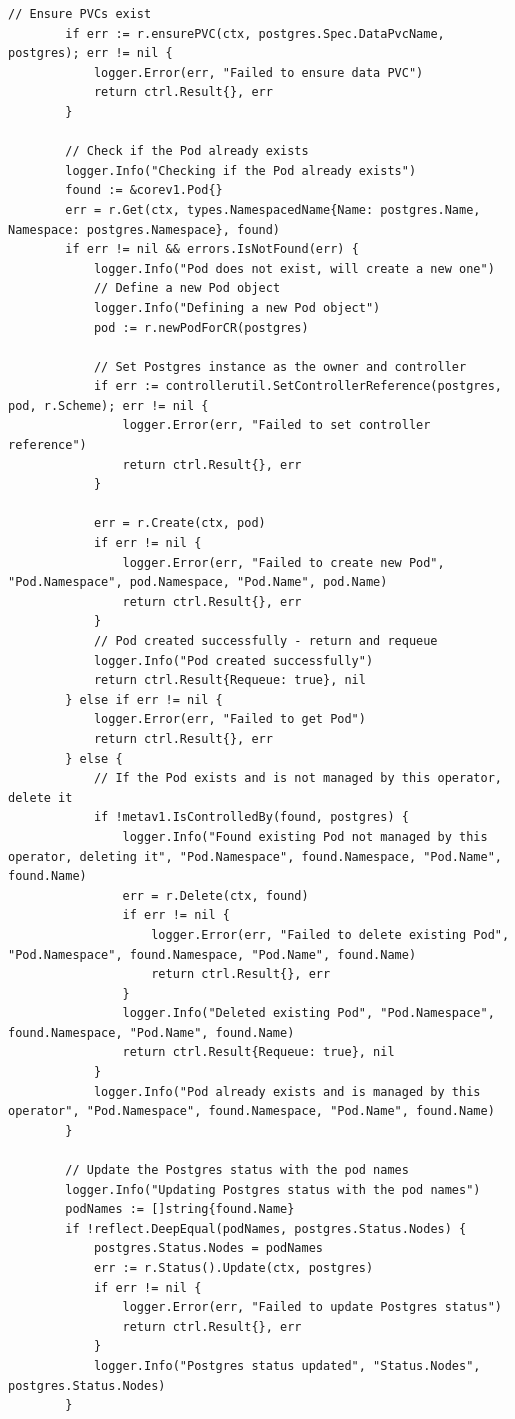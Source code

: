 \documentclass[polish]{aghengthesis}
\begin{document}
\begin{enumerate}
\begin{lstlisting}[caption=fragment kontrolera dla PostgreSQL]
    	// Ensure PVCs exist
    	if err := r.ensurePVC(ctx, postgres.Spec.DataPvcName, postgres); err != nil {
    		logger.Error(err, "Failed to ensure data PVC")
    		return ctrl.Result{}, err
    	}
    
    	// Check if the Pod already exists
    	logger.Info("Checking if the Pod already exists")
    	found := &corev1.Pod{}
    	err = r.Get(ctx, types.NamespacedName{Name: postgres.Name, Namespace: postgres.Namespace}, found)
    	if err != nil && errors.IsNotFound(err) {
    		logger.Info("Pod does not exist, will create a new one")
    		// Define a new Pod object
    		logger.Info("Defining a new Pod object")
    		pod := r.newPodForCR(postgres)
    
    		// Set Postgres instance as the owner and controller
    		if err := controllerutil.SetControllerReference(postgres, pod, r.Scheme); err != nil {
    			logger.Error(err, "Failed to set controller reference")
    			return ctrl.Result{}, err
    		}
    
    		err = r.Create(ctx, pod)
    		if err != nil {
    			logger.Error(err, "Failed to create new Pod", "Pod.Namespace", pod.Namespace, "Pod.Name", pod.Name)
    			return ctrl.Result{}, err
    		}
    		// Pod created successfully - return and requeue
    		logger.Info("Pod created successfully")
    		return ctrl.Result{Requeue: true}, nil
    	} else if err != nil {
    		logger.Error(err, "Failed to get Pod")
    		return ctrl.Result{}, err
    	} else {
    		// If the Pod exists and is not managed by this operator, delete it
    		if !metav1.IsControlledBy(found, postgres) {
    			logger.Info("Found existing Pod not managed by this operator, deleting it", "Pod.Namespace", found.Namespace, "Pod.Name", found.Name)
    			err = r.Delete(ctx, found)
    			if err != nil {
    				logger.Error(err, "Failed to delete existing Pod", "Pod.Namespace", found.Namespace, "Pod.Name", found.Name)
    				return ctrl.Result{}, err
    			}
    			logger.Info("Deleted existing Pod", "Pod.Namespace", found.Namespace, "Pod.Name", found.Name)
    			return ctrl.Result{Requeue: true}, nil
    		}
    		logger.Info("Pod already exists and is managed by this operator", "Pod.Namespace", found.Namespace, "Pod.Name", found.Name)
    	}
    
    	// Update the Postgres status with the pod names
    	logger.Info("Updating Postgres status with the pod names")
    	podNames := []string{found.Name}
    	if !reflect.DeepEqual(podNames, postgres.Status.Nodes) {
    		postgres.Status.Nodes = podNames
    		err := r.Status().Update(ctx, postgres)
    		if err != nil {
    			logger.Error(err, "Failed to update Postgres status")
    			return ctrl.Result{}, err
    		}
    		logger.Info("Postgres status updated", "Status.Nodes", postgres.Status.Nodes)
    	}
    

\end{lstlisting}
\end{enumerate}
\end{document}
